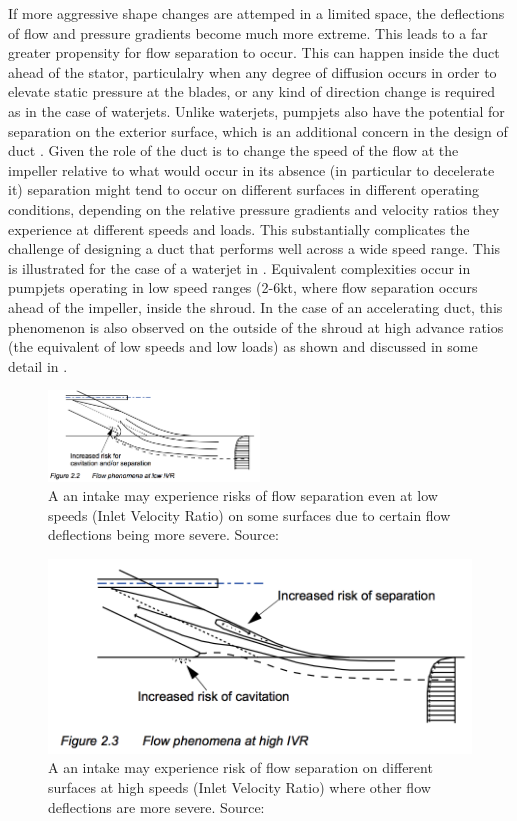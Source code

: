 \documentclass{article}\usepackage[]{graphicx}\usepackage[]{color}
\begin{document}
If more aggressive shape changes are attemped in a limited space, the deflections of flow and pressure gradients become much more extreme. This leads to a far greater propensity for flow separation to occur.  This can happen inside the duct ahead of the stator, particulalry when any degree of diffusion occurs in order to elevate static pressure at the blades, or any kind of direction change is required as in the case of waterjets. Unlike waterjets, pumpjets also have the potential for separation on the exterior surface, which is an additional concern in the design of duct \cite[13]{henderson1964}.  Given the role of the duct is to change the speed of the flow at the impeller relative to what would occur in its absence (in particular to decelerate it) separation might tend to occur on different surfaces in different operating conditions, depending on the relative pressure gradients and velocity ratios they experience at different speeds and loads.  This substantially complicates the challenge of designing a duct that performs well across a wide speed range. This is illustrated for the case of a waterjet in \cite[20]{bulten2006numerical}.  Equivalent complexities occur in pumpjets operating in low speed ranges (2-6kt, where flow separation occurs ahead of the impeller, inside the shroud.  In the case of an accelerating duct, this phenomenon is also observed on the outside of the shroud at high advance ratios (the equivalent of low speeds and low loads) as shown and discussed in some detail in \cite{willemsen2013}.

\begin{figure}
\includegraphics[width=0.5\textwidth]{LowIVR.png}
\caption{A an intake may experience risks of flow separation even at low speeds (Inlet Velocity Ratio) on some surfaces due to certain flow deflections being more severe. Source: \cite{bulten2006numerical}}
\label{fig:LowIVR.png}
\end{figure}

\begin{figure}
\includegraphics[width=\textwidth]{HighIVR.png}
\caption{A an intake may experience risk of flow separation on different surfaces at high speeds (Inlet Velocity Ratio) where other flow deflections are more severe. Source: \cite{bulten2006numerical}}
\label{fig:HighIVR.png}
\end{figure}
\end{document}
